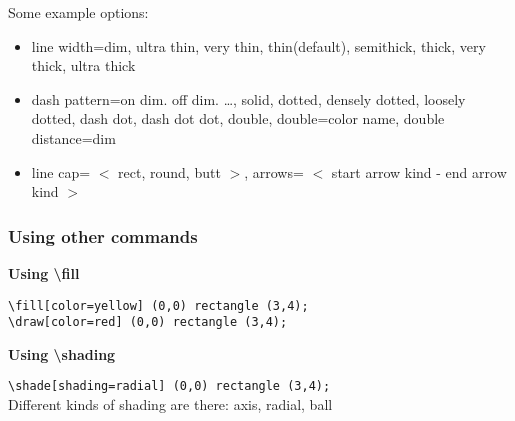 \documentclass{article}
\begin{document}
Some example options:\\
\begin{itemize}
    \item line width=dim, ultra thin, very thin, thin(default), semithick, thick, very thick, ultra thick
    \item dash pattern=on dim. off dim. \ldots, solid, dotted, densely dotted, loosely dotted, dash dot, dash dot dot, double, double=color name, double distance=dim
    \item line cap= $<$ rect, round, butt $>$, arrows= $<$ start arrow kind - end arrow kind $>$
\end{itemize}

\vskip25pt

\vskip25pt
\newpage
\subsubsection*{Using other commands}
\textbf{Using \textbackslash fill}\\

\verb|\fill[color=yellow] (0,0) rectangle (3,4);|\\
\verb|\draw[color=red] (0,0) rectangle (3,4);|

\vskip1cm

\textbf{Using \textbackslash shading}\\

\verb|\shade[shading=radial] (0,0) rectangle (3,4);|\\

Different kinds of shading are there: axis, radial, ball\\
\end{document}
